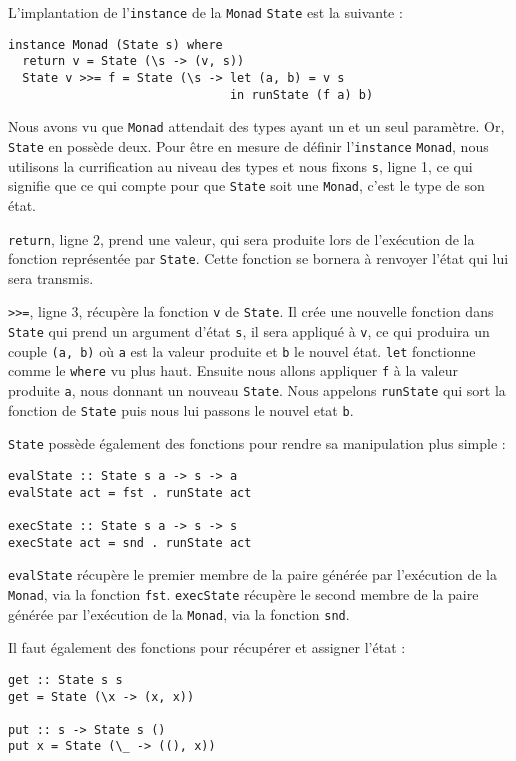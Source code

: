 \documentclass{llncs}
\begin{document}
L'implantation de l'\lstinline{instance} de la \lstinline{Monad} \lstinline{State}
est la suivante :
\begin{lstlisting}
instance Monad (State s) where
  return v = State (\s -> (v, s))
  State v >>= f = State (\s -> let (a, b) = v s
                               in runState (f a) b)
\end{lstlisting}

Nous avons vu que \lstinline{Monad} attendait des types ayant un et un seul paramètre.
Or, \lstinline{State} en possède deux.
Pour être en mesure de définir l'\lstinline{instance} \lstinline{Monad},
nous utilisons la currification au niveau des types et nous fixons \lstinline{s},
ligne 1, ce qui signifie que ce qui compte pour que \lstinline{State} soit une \lstinline{Monad},
c'est le type de son état.

\lstinline{return}, ligne 2, prend une valeur, qui sera produite lors de
l'exécution de la fonction représentée par \lstinline{State}.
Cette fonction se bornera à renvoyer l'état qui lui sera transmis.

\lstinline{>>=}, ligne 3, récupère la fonction \lstinline{v} de \lstinline{State}.
Il crée une nouvelle fonction dans \lstinline{State} qui prend
un argument d'état \lstinline{s}, il sera appliqué à \lstinline{v}, ce qui
produira un couple \lstinline{(a, b)} où \lstinline{a} est la valeur produite
et  \lstinline{b} le nouvel état.
\lstinline{let} fonctionne comme le \lstinline{where} vu plus haut.
Ensuite nous allons appliquer \lstinline{f} à la valeur produite \lstinline{a},
nous donnant un nouveau \lstinline{State}.
Nous appelons \lstinline{runState} qui sort la fonction de \lstinline{State}
puis nous lui passons le nouvel etat \lstinline{b}.

\lstinline{State} possède également des fonctions pour rendre sa manipulation
plus simple :
\begin{lstlisting}
evalState :: State s a -> s -> a
evalState act = fst . runState act

execState :: State s a -> s -> s
execState act = snd . runState act
\end{lstlisting}
\lstinline{evalState} récupère le premier membre de la paire générée par l'exécution
de la \lstinline{Monad}, via la fonction \lstinline{fst}.
\lstinline{execState} récupère le second membre de la paire générée par l'exécution
de la \lstinline{Monad}, via la fonction \lstinline{snd}.

Il faut également des fonctions pour récupérer et assigner l'état :
\begin{lstlisting}
get :: State s s
get = State (\x -> (x, x))

put :: s -> State s ()
put x = State (\_ -> ((), x))
\end{lstlisting}
\end{document}
